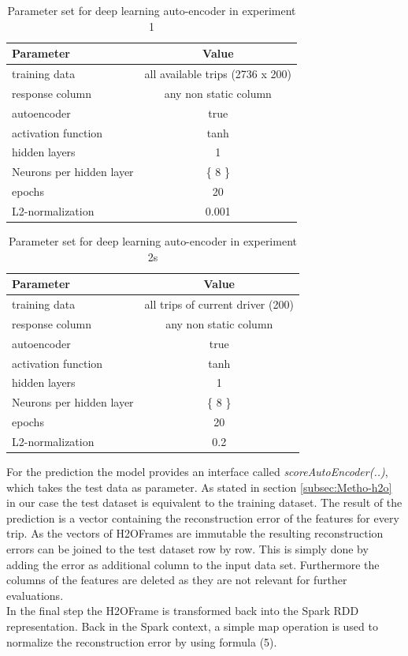 \documentclass{vldb}
\begin{document}
\begin{table}
\centering
\begin{tabular}{l | c}
Parameter            & Value\\ \hline
training data        & all available trips (2736 x 200) \\
response column      & any non static column \\
autoencoder          & true \\
activation function  & tanh \\
hidden layers        & 1 \\
Neurons per hidden layer        & \{ 8 \}\\
epochs               & 20\\
L2-normalization     & 0.001
\end{tabular}
\caption{Parameter set for deep learning auto-encoder in experiment 1}
\label{table:param-set-exp1}
\end{table}

\begin{table}
\centering
\begin{tabular}{l | c}
Parameter            & Value\\ \hline
training data        & all trips of current driver (200) \\
response column      & any non static column \\
autoencoder          & true \\
activation function  & tanh \\
hidden layers        & 1 \\
Neurons per hidden layer        & \{ 8 \}\\
epochs               & 20\\
L2-normalization     & 0.2
\end{tabular}
\caption{Parameter set for deep learning auto-encoder in experiment 2s}
\label{table:param-set-exp2}
\end{table}

For the prediction the model provides an interface called \textit{scoreAutoEncoder(..)}, which takes the test data as parameter. As stated in section \ref{subsec:Metho-h2o} in our case the test dataset is equivalent to the training dataset. The result of the prediction is a vector containing the reconstruction error of the features for every trip. As the vectors of H2OFrames are immutable the resulting reconstruction errors can be joined to the test dataset row by row. This is simply done by adding the error as additional column to the input data set. Furthermore the columns of the features are deleted as they are not relevant for further evaluations. \\
In the final step the H2OFrame is transformed back into the Spark RDD representation. Back in the Spark context,  a simple map operation is used to  normalize the reconstruction error by using formula (5).
\end{document}
